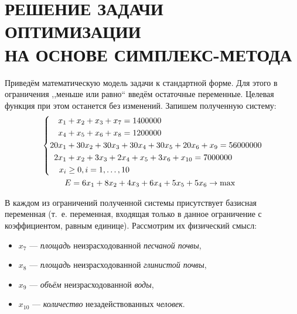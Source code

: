\section[РЕШЕНИЕ ЗАДАЧИ ОПТИМИЗАЦИИ НА ОСНОВЕ \\ СИМПЛЕКС-МЕТОДА]{РЕШЕНИЕ ЗАДАЧИ ОПТИМИЗАЦИИ \\ НА ОСНОВЕ СИМПЛЕКС-МЕТОДА}

Приведём математическую модель задачи к стандартной форме. Для этого в ограничения ,,меньше или равно`` введём остаточные переменные. Целевая функция при этом останется без изменений. Запишем полученную систему:
\begin{equation}
\label{eq:SystemInStandartForm}
	\begin{aligned}
  	&\left\{
    	\begin{aligned}
	      x_1 & + x_2 + x_3 + x_7 = 1 400 000 \\
	      x_4 & + x_5 + x_6 + x_8 = 1 200 000 \\
	      20x_1 & + 30x_2 + 30x_3 + 30x_4 + 30x_5 + 20x_6 + x_9 = 56 000 000 \\
	      2x_1 & + x_2 + 3x_3 + 2x_4 + x_5 + 3x_6 + x_{10} = 7 000 000 \\
	      x_i &\ge 0, i = 1, \ldots ,10  
    	\end{aligned}
  	\right.
  	\\
  	& \hspace{10mm} E = 6x_1 + 8x_2 + 4x_3 + 6x_4 + 5x_5 + 5x_6 \rightarrow \max
	\end{aligned}
\end{equation}

В каждом из ограничений полученной системы присутствует базисная переменная (т.~е. переменная, входящая только в данное ограничение с коэффициентом, равным единице). Рассмотрим их физический смысл:

\begin{itemize}

\item
  $ x_{7} $ --- \textsl{площадь} неизрасходованной \textsl{песчаной почвы},
\item
  $ x_{8} $ --- \textsl{площадь} неизрасходованной \textsl{глинистой почвы},
\item
  $ x_{9} $ --- \textsl{объём} неизрасходованной \textsl{воды},
\item
  $ x_{10} $ --- \textsl{количество} незадействованных \textsl{человек}.

\end{itemize}

